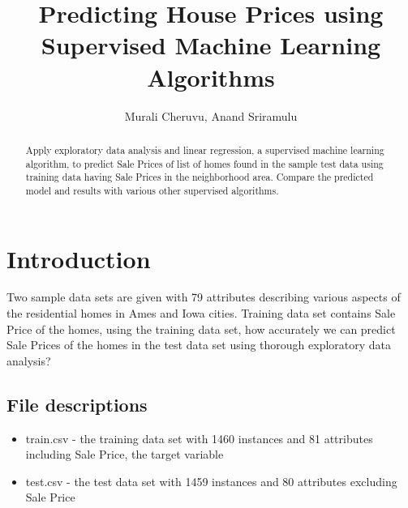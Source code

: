 \documentclass[sigconf]{acmart}
\begin{document}
		
	\title{Predicting House Prices using Supervised Machine Learning Algorithms}
	
	
	\author{Murali Cheruvu, Anand Sriramulu}
	
	\renewcommand{\shortauthors}{M. Cheruvu, A Sriramulu}
	
	
	\begin{abstract}
		
	Apply exploratory data analysis and linear regression, a supervised machine learning algorithm, to predict Sale Prices of list of homes found in the sample test data using training data having Sale Prices in the neighborhood area. Compare the predicted model and results with various other supervised algorithms.
	
	\end{abstract}
	
	
	\maketitle
	
	\section{Introduction} %
	
	Two sample data sets are given with 79 attributes describing various aspects of the residential homes in Ames and Iowa cities. Training data set contains Sale Price of the homes, using the training data set, how accurately we can predict Sale Prices of the homes in the test data set using thorough exploratory data analysis?
	
	\subsection{File descriptions}
	
	\begin{itemize}
		
		\item train.csv - the training data set with 1460 instances and 81 attributes including Sale Price, the target variable
		\item test.csv - the test data set with 1459 instances and 80 attributes excluding Sale Price
		
	\end{itemize}
	
\end{document}
